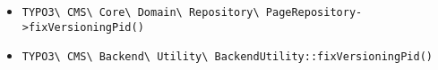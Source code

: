 \begin{frame}[fragile]
\begin{itemize}
			\begin{itemize}\smaller
				\item \texttt{TYPO3\textbackslash
					CMS\textbackslash
					Core\textbackslash
					Domain\textbackslash
					Repository\textbackslash
					PageRepository->fixVersioningPid()}
				\item \texttt{TYPO3\textbackslash
					CMS\textbackslash
					Backend\textbackslash
					Utility\textbackslash
					BackendUtility::fixVersioningPid()}
			\end{itemize}\normalsize

	\end{itemize}

\end{frame}

